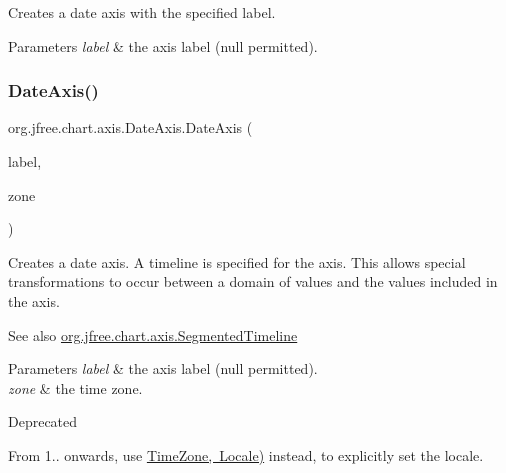Creates a date axis with the specified label.


\begin{DoxyParams}{Parameters}
{\em label} & the axis label ({\ttfamily null} permitted). \\
\hline
\end{DoxyParams}
\mbox{\label{classorg_1_1jfree_1_1chart_1_1axis_1_1_date_axis_ab89e8e04c67b64194f9d22048fdfd90f}} 
\subsubsection{\texorpdfstring{Date\+Axis()}{DateAxis()}\hspace{0.1cm}{\footnotesize\ttfamily [3/4]}}
{\footnotesize\ttfamily org.\+jfree.\+chart.\+axis.\+Date\+Axis.\+Date\+Axis (\begin{DoxyParamCaption}\item[{String}]{label,  }\item[{Time\+Zone}]{zone }\end{DoxyParamCaption})}

Creates a date axis. A timeline is specified for the axis. This allows special transformations to occur between a domain of values and the values included in the axis.

\begin{DoxySeeAlso}{See also}
\mbox{\hyperlink{classorg_1_1jfree_1_1chart_1_1axis_1_1_segmented_timeline}{org.\+jfree.\+chart.\+axis.\+Segmented\+Timeline}}
\end{DoxySeeAlso}

\begin{DoxyParams}{Parameters}
{\em label} & the axis label ({\ttfamily null} permitted). \\
\hline
{\em zone} & the time zone.\\
\hline
\end{DoxyParams}
\begin{DoxyRefDesc}{Deprecated}
\item[\mbox{\hyperlink{deprecated__deprecated000004}{Deprecated}}]From 1.. onwards, use \mbox{\hyperlink{classorg_1_1jfree_1_1chart_1_1axis_1_1_date_axis_a612cb63cb23fd18583e242f7268819b5}{Time\+Zone, Locale)}} instead, to explicitly set the locale. \end{DoxyRefDesc}
\mbox{\label{classorg_1_1jfree_1_1chart_1_1axis_1_1_date_axis_a772bdb421a615502265f4213c9d3f9b4}} 
